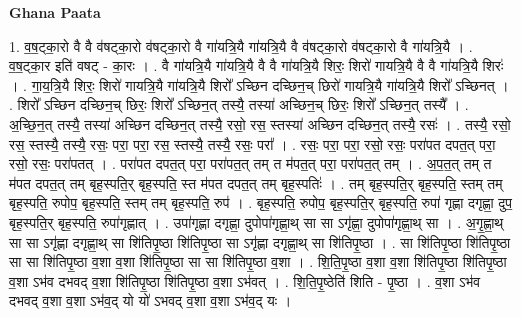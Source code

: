 \documentclass[17pt]{extarticle}
\begin{document}
\textbf{Ghana Paata } \newline

1. व॒ष॒ट्का॒रो वै वै व॑षट्का॒रो व॑षट्का॒रो वै गा॑यत्रि॒यै गा॑यत्रि॒यै वै व॑षट्का॒रो व॑षट्का॒रो वै गा॑यत्रि॒यै । . व॒ष॒ट्का॒र इति॑ वषट् - का॒रः । . वै गा॑यत्रि॒यै गा॑यत्रि॒यै वै वै गा॑यत्रि॒यै शिरः॒ शिरो॑ गायत्रि॒यै वै वै गा॑यत्रि॒यै शिरः॑ । . गा॒य॒त्रि॒यै शिरः॒ शिरो॑ गायत्रि॒यै गा॑यत्रि॒यै शिरो᳚ ऽच्छिन दच्छिन॒च् छिरो॑ गायत्रि॒यै गा॑यत्रि॒यै शिरो᳚ ऽच्छिनत् । . शिरो᳚ ऽच्छिन दच्छिन॒च् छिरः॒ शिरो᳚ ऽच्छिन॒त् तस्यै॒ तस्या॑ अच्छिन॒च् छिरः॒ शिरो᳚ ऽच्छिन॒त् तस्यै᳚ । . अ॒च्छि॒न॒त् तस्यै॒ तस्या॑ अच्छिन दच्छिन॒त् तस्यै॒ रसो॒ रस॒ स्तस्या॑ अच्छिन दच्छिन॒त् तस्यै॒ रसः॑ । . तस्यै॒ रसो॒ रस॒ स्तस्यै॒ तस्यै॒ रसः॒ परा॒ परा॒ रस॒ स्तस्यै॒ तस्यै॒ रसः॒ परा᳚ । . रसः॒ परा॒ परा॒ रसो॒ रसः॒ परा॑पत दपत॒त् परा॒ रसो॒ रसः॒ परा॑पतत् । . परा॑पत दपत॒त् परा॒ परा॑पत॒त् तम् त म॑पत॒त् परा॒ परा॑पत॒त् तम् । . अ॒प॒त॒त् तम् त म॑पत दपत॒त् तम् बृह॒स्पति॒र् बृह॒स्पति॒ स्त म॑पत दपत॒त् तम् बृह॒स्पतिः॑ । . तम् बृह॒स्पति॒र् बृह॒स्पति॒ स्तम् तम् बृह॒स्पति॒ रुपोप॒ बृह॒स्पति॒ स्तम् तम् बृह॒स्पति॒ रुप॑ । . बृह॒स्पति॒ रुपोप॒ बृह॒स्पति॒र् बृह॒स्पति॒ रुपा॑ गृह्णा दगृह्णा॒ दुप॒ बृह॒स्पति॒र् बृह॒स्पति॒ रुपा॑गृह्णात् । . उपा॑गृह्णा दगृह्णा॒ दुपोपा॑गृह्णा॒थ् सा सा ऽगृ॑ह्णा॒ दुपोपा॑गृह्णा॒थ् सा । . अ॒गृ॒ह्णा॒थ् सा सा ऽगृ॑ह्णा दगृह्णा॒थ् सा शि॑तिपृ॒ष्ठा शि॑तिपृ॒ष्ठा सा ऽगृ॑ह्णा दगृह्णा॒थ् सा शि॑तिपृ॒ष्ठा । . सा शि॑तिपृ॒ष्ठा शि॑तिपृ॒ष्ठा सा सा शि॑तिपृ॒ष्ठा व॒शा व॒शा शि॑तिपृ॒ष्ठा सा सा शि॑तिपृ॒ष्ठा व॒शा । . शि॒ति॒पृ॒ष्ठा व॒शा व॒शा शि॑तिपृ॒ष्ठा शि॑तिपृ॒ष्ठा व॒शा ऽभ॑व दभवद् व॒शा शि॑तिपृ॒ष्ठा शि॑तिपृ॒ष्ठा व॒शा ऽभ॑वत् । . शि॒ति॒पृ॒ष्ठेति॑ शिति - पृ॒ष्ठा । . व॒शा ऽभ॑व दभवद् व॒शा व॒शा ऽभ॑व॒द् यो यो॑ ऽभवद् व॒शा व॒शा ऽभ॑व॒द् यः । \newline
\end{document}
